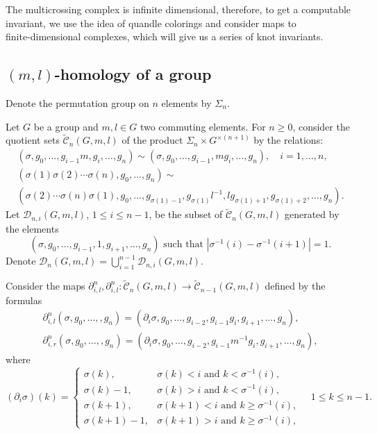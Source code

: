 \documentclass{article}
\theoremstyle{definition}
\theoremstyle{remark}
\begin{document}
The multicrossing complex is infinite dimensional, therefore, to get a computable invariant, we use the idea of quandle colorings and consider maps to finite‑dimensional complexes, which will give us a series of knot invariants.

\subsection{$(m,l)$-homology of a group}

Denote the permutation group on $n$ elements by $\Sigma_n$.

Let $G$ be a group and $m,l\in G$ two commuting elements. For $n\ge 0$, consider the quotient sets $\tilde{\mathcal C}_n(G,m,l)$ of the product $\Sigma_n\times G^{\times (n+1)}$ by the relations:
\begin{gather*}
    (\sigma,g_0,\dots, g_{i-1}m,g_i,\dots,g_n)\sim  (\sigma,g_0,\dots, g_{i-1},mg_i,\dots,g_n),\quad i=1,\dots,n,\\
(\sigma(1)\sigma(2)\cdots\sigma(n),g_0,\dots,g_n)\sim\\
 (\sigma(2)\cdots\sigma(n)\sigma(1),g_0,\dots,g_{\sigma(1)-1},g_{\sigma(1)}l^{-1},lg_{\sigma(1)+1},g_{\sigma(1)+2},\dots, g_n).
\end{gather*}
Let ${\mathcal D}_{n,i}(G,m,l)$, $1\le i\le n-1$, be the subset of $\tilde{\mathcal C}_n(G,m,l)$ generated by the elements
\[
(\sigma,g_0,\dots,g_{i-1}, 1, g_{i+1},\dots,g_n)\mbox{ such that } |\sigma^{-1}(i)-\sigma^{-1}(i+1)|=1.
\]
Denote ${\mathcal D}_{n}(G,m,l)=\bigcup_{i=1}^{n-1}{\mathcal D}_{n,i}(G,m,l)$.

Consider the maps $\partial^n_{i,l}, \partial^n_{i,l}\colon \tilde{\mathcal C}_n(G,m,l)\to \tilde{\mathcal C}_{n-1}(G,m,l)$ defined by the formulas
\begin{gather*}
    \partial^n_{i,l}(\sigma,g_0,\dots,,g_n)=(\partial_i\sigma,g_0,\dots,g_{i-2}, g_{i-1}g_i, g_{i+1},\dots,g_n),\\
    \partial^n_{i,r}(\sigma,g_0,\dots,,g_n)=(\partial_i\sigma,g_0,\dots,g_{i-2}, g_{i-1}m^{-1}g_i, g_{i+1},\dots,g_n),
\end{gather*}
where
\[
(\partial_i\sigma)(k)=\left\{\begin{array}{cl}
    \sigma(k), & \sigma(k)<i\mbox{ and }k<\sigma^{-1}(i), \\
    \sigma(k)-1, & \sigma(k)> i\mbox{ and }k<\sigma^{-1}(i), \\
    \sigma(k+1), & \sigma(k+1)<i\mbox{ and }k\ge \sigma^{-1}(i), \\
    \sigma(k+1)-1, & \sigma(k+1)> i\mbox{ and }k\ge \sigma^{-1}(i),
\end{array}\right.\quad 1\le k\le n-1.
\]
\end{document}
